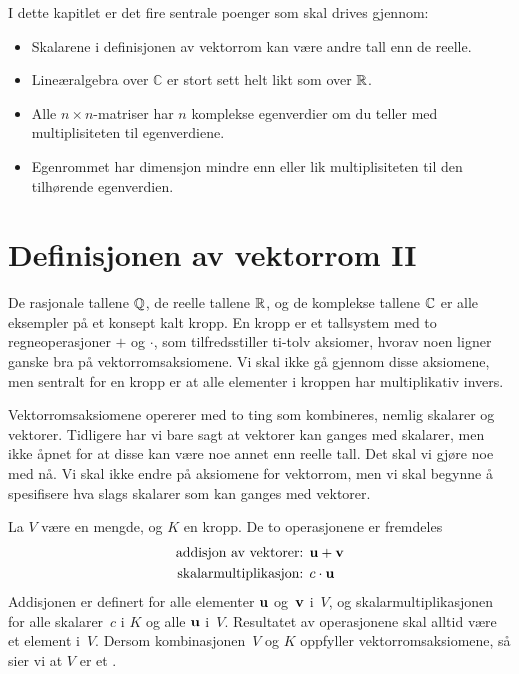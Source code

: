 

\label{ch:kompleks-linear-algebra}

I dette kapitlet er det fire sentrale poenger som skal drives gjennom:

\begin{itemize}
\item Skalarene i definisjonen av vektorrom kan være andre tall enn de reelle.

\item Lineæralgebra over $\mathbb C$ er stort sett helt likt som over $\mathbb{R}$.

\item Alle $n\times n$-matriser har $n$ komplekse egenverdier om du teller med multiplisiteten til egenverdiene.
 
\item Egenrommet har dimensjon mindre enn eller lik multiplisiteten til den tilhørende egenverdien.
\end{itemize}

\section*{Definisjonen av vektorrom II}

De rasjonale tallene $\mathbb{Q}$, de reelle tallene $\mathbb{R}$, 
og de komplekse tallene $\mathbb{C}$ er alle eksempler på et konsept kalt kropp. 
En kropp er et tallsystem med to regneoperasjoner $+$ og $\cdot$, 
som tilfredsstiller ti-tolv aksiomer, 
hvorav noen ligner ganske bra på vektorromsaksiomene. 
Vi skal ikke gå gjennom disse aksiomene, 
men sentralt for en kropp er at alle elementer i kroppen har multiplikativ invers.

Vektorromsaksiomene opererer med to ting som kombineres, nemlig skalarer og vektorer. 
Tidligere har vi bare sagt at vektorer kan ganges med skalarer, 
men ikke åpnet for at disse kan være noe annet enn reelle tall. 
Det skal vi gjøre noe med nå. 
Vi skal ikke endre på aksiomene for vektorrom, 
men vi skal begynne å spesifisere hva slags skalarer som kan ganges med vektorer. 

\begin{defn}
La $V$ være en mengde, og $K$ en kropp. De to operasjonene er fremdeles
\begin{align*}
\text{addisjon av vektorer: } & \mathbf{u} + \mathbf{v} \\
\text{skalarmultiplikasjon: } & c \cdot \mathbf{u}
\end{align*}
Addisjonen er definert for alle elementer $\mathbf{u}$ og~$\mathbf{v}$
i~$V$, og skalarmultiplikasjonen for alle skalarer~$c$ i $K$ og alle $\mathbf{u}$
i~$V$.  Resultatet av operasjonene skal alltid være et element i~$V$.
Dersom kombinasjonen~$V$ og $K$ oppfyller vektorromsaksiomene, 
så sier vi at $V$ er et .
\end{defn}


